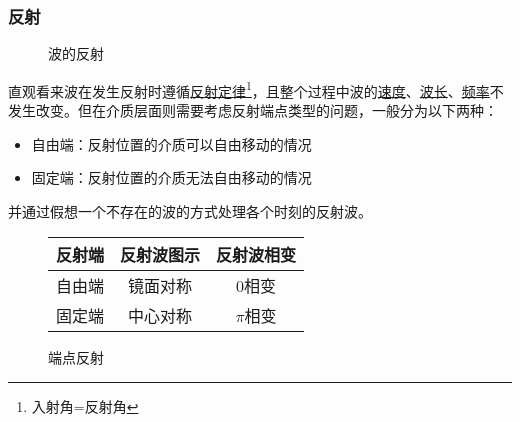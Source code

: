 \subsubsection{反射}

\begin{figure}[ht!]
    \centering
    \caption{波的反射}
\end{figure}
直观看来波在发生反射时遵循\underline{反射定律}\footnote{入射角=反射角}，且整个过程中波的\underline{速度}、\underline{波长}、\underline{频率}不发生改变。但在介质层面则需要考虑反射端点类型的问题，一般分为以下两种：
\begin{itemize}
    \item 自由端：反射位置的介质可以自由移动的情况
    \item 固定端：反射位置的介质无法自由移动的情况
\end{itemize}
并通过假想一个不存在的波的方式处理各个时刻的反射波。
\begin{figure}[ht!]
    \centering
    \renewcommand\arraystretch{1.2}
    \begin{tabular}{c|cc}
        \hline
        反射端&反射波图示&反射波相变\\\hline
        自由端&镜面对称&0相变\\
        固定端&中心对称&$\pi$相变\\\hline
    \end{tabular}
    \caption{端点反射}
\end{figure}
